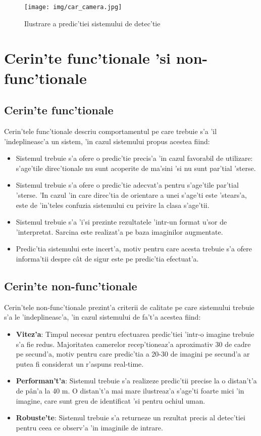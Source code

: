\documentclass[12pt,a4paper,twoside]{report}
\begin{document}
\begin{figure}[H]
  \texttt{[image: img/car\_camera.jpg]}
  \centering
  \caption{Ilustrare a predic'tiei sistemului de detec'tie}
  \label{fig:car_camera}
\end{figure}

\section{Cerin'te func'tionale 'si non-func'tionale}
\subsection{Cerin'te func'tionale}
Cerin'tele func'tionale descriu comportamentul pe care trebuie s'a 'il 'indeplineasc'a un sistem, 'in cazul sistemului propus acestea fiind:
\begin{itemize}
\item Sistemul trebuie s'a ofere o predic'tie precis'a 'in cazul favorabil de utilizare: s'age'tile direc'tionale nu sunt acoperite de ma'sini 'si nu sunt par'tial 'sterse.

\item Sistemul trebuie s'a ofere o predic'tie adecvat'a pentru s'age'tile par'tial 'sterse. 'In cazul 'in care direc'tia de orientare a unei s'age'ti este 'stears'a, este de 'in'teles confuzia sistemului cu privire la clasa s'age'tii.

\item Sistemul trebuie s'a 'i'si prezinte rezultatele 'intr-un format u'sor de 'interpretat. Sarcina este realizat'a pe baza imaginilor augmentate.

\item Predic'tia sistemului este incert'a, motiv pentru care acesta trebuie s'a ofere informa'tii despre c\^at de sigur este pe predic'tia efectuat'a.

\end{itemize}  

\subsection{Cerin'te non-func'tionale}
Cerin'tele non-func'tionale prezint'a criterii de calitate pe care sistemului trebuie s'a le 'indeplineasc'a, 'in cazul sistemului de fa't'a acestea fiind:
\begin{itemize}
\item \textbf{Vitez'a}: Timpul necesar pentru efectuarea predic'tiei 'intr-o imagine trebuie s'a fie redus. Majoritatea camerelor recep'tioneaz'a aproximativ 30 de cadre pe secund'a, motiv pentru care predic'tia a 20-30 de imagini pe secund'a ar putea fi considerat un r'aspuns real-time.
\item \textbf{Performan't'a}: Sistemul trebuie s'a realizeze predic'tii precise la o distan't'a de p\^an'a la 40 m. O distan't'a mai mare ilustreaz'a s'age'ti foarte mici 'in imagine, care sunt greu de identificat 'si pentru ochiul uman.
\item \textbf{Robuste'te}: Sistemul trebuie s'a returneze un rezultat precis al detec'tiei pentru ceea ce observ'a 'in imaginile de intrare.
\end{itemize}
\end{document}

